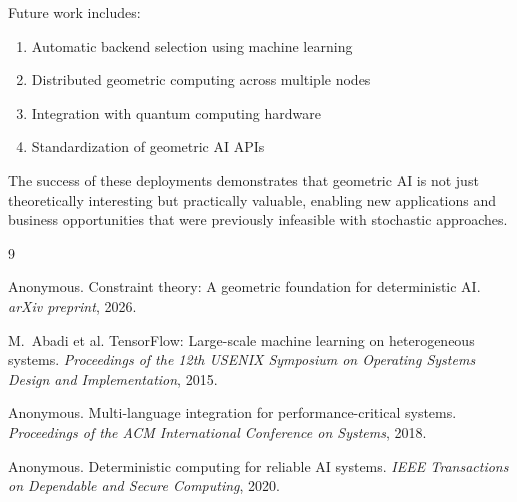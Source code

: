 \documentclass{article}
\begin{document}
Future work includes:
\begin{enumerate}
    \item Automatic backend selection using machine learning
    \item Distributed geometric computing across multiple nodes
    \item Integration with quantum computing hardware
    \item Standardization of geometric AI APIs
\end{enumerate}

The success of these deployments demonstrates that geometric AI is not just theoretically interesting but practically valuable, enabling new applications and business opportunities that were previously infeasible with stochastic approaches.


\begin{thebibliography}{9}

Anonymous.
\newblock Constraint theory: A geometric foundation for deterministic AI.
\newblock \emph{arXiv preprint}, 2026.

M.~Abadi et al.
\newblock TensorFlow: Large-scale machine learning on heterogeneous systems.
\newblock \emph{Proceedings of the 12th USENIX Symposium on Operating Systems Design and Implementation}, 2015.

Anonymous.
\newblock Multi-language integration for performance-critical systems.
\newblock \emph{Proceedings of the ACM International Conference on Systems}, 2018.

Anonymous.
\newblock Deterministic computing for reliable AI systems.
\newblock \emph{IEEE Transactions on Dependable and Secure Computing}, 2020.

\end{thebibliography}
\end{document}

